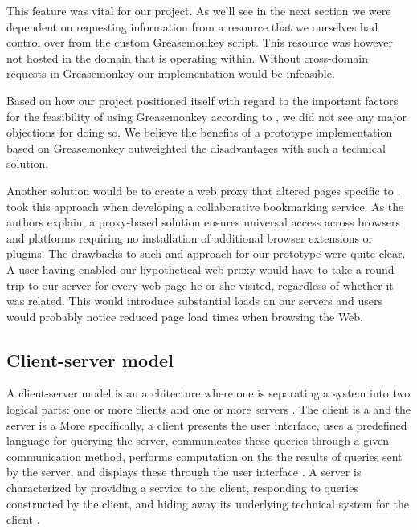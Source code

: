 This feature was vital for our project. As we'll see in the next section we
were dependent on requesting information from a resource that we ourselves had
control over from the custom Greasemonkey script. This resource was however
not hosted in the domain that \urort{} is operating within. Without
cross-domain requests in Greasemonkey our implementation would be infeasible.

\parabreak

Based on how our project positioned itself with regard to the important
factors for the feasibility of using Greasemonkey
according to \citet{laird07}, we did not
see any major objections for doing so.
We believe the benefits of a prototype implementation
based on Greasemonkey outweighted the disadvantages with such a technical
solution.

Another solution would be to create a web proxy that altered pages specific to
\urort{}. \citet[]{keller97} took this approach when developing
a collaborative bookmarking service. As the authors explain, a proxy-based
solution ensures universal access across browsers and platforms requiring no
installation of additional browser extensions or plugins. The drawbacks to
such and approach for our prototype were quite clear. A user having enabled
our hypothetical web proxy would have to take a round trip to our server for
every web page he or she visited, regardless of whether it was \urort{}
related. This would introduce substantial loads on our servers and users would
probably notice reduced page load times when browsing the Web.

\subsection{Client-server model}

A client-server model is an architecture where one is separating a system into
two logical parts:
one or more clients and one or more servers \citep[]{lewandowski98}.
The client is a 
and the server is a 
More specifically, a client presents the user interface, uses a predefined
language for querying the server, communicates these queries through a given
communication method, performs computation on the the results of queries sent
by the server, and displays these through the user interface
\citep[]{sinha92}. A server is characterized by providing a service
to the client, responding to queries constructed by the client,
and hiding away its underlying technical system for the client
\citep[]{sinha92}.

